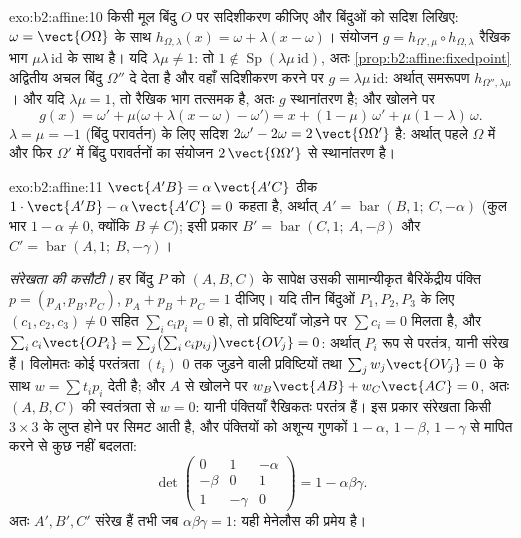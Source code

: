 \begin{solution}{exo:b2:affine:10}
किसी मूल बिंदु $O$ पर सदिशीकरण कीजिए और बिंदुओं को सदिश लिखिए: $\omega = \vect{O\Omega}$ के साथ
$h_{\Omega, \lambda}(x) = \omega + \lambda(x - \omega)$। संयोजन $g = h_{\Omega',
\mu} \circ h_{\Omega, \lambda}$ रैखिक भाग $\mu\lambda\,\mathrm{id}$ के साथ  है। यदि $\lambda\mu \neq 1$: तो $1 \notin
\operatorname{Sp}(\lambda\mu\,\mathrm{id})$, अतः \cref{prop:b2:affine:fixedpoint}
अद्वितीय अचल बिंदु $\Omega''$ दे देता है और वहाँ सदिशीकरण करने पर $g =
\lambda\mu\,\mathrm{id}$: अर्थात्
समरूपण $h_{\Omega'',
\lambda\mu}$। और यदि $\lambda\mu = 1$, तो रैखिक भाग तत्समक है, अतः $g$ स्थानांतरण है;
और खोलने पर
\[
g(x) = \omega' + \mu\bigl(\omega + \lambda(x - \omega) -
\omega'\bigr) = x + (1 - \mu)\,\omega' + \mu(1 -
\lambda)\,\omega .
\]
$\lambda = \mu = -1$ (बिंदु परावर्तन) के लिए सदिश $2\omega' - 2\omega = 2\,\vect{\Omega\Omega'}$ है: अर्थात् पहले $\Omega$ में और फिर
$\Omega'$ में बिंदु परावर्तनों का संयोजन $2\,\vect{\Omega\Omega'}$ से स्थानांतरण है।
\end{solution}

\begin{solution}{exo:b2:affine:11}
$\vect{A'B} = \alpha\,\vect{A'C}$ ठीक $1\cdot
\vect{A'B} - \alpha\,\vect{A'C} = 0$ कहता है, अर्थात् $A' =
\operatorname{bar}(B, 1;\ C, -\alpha)$ (कुल भार $1 -
\alpha \neq 0$, क्योंकि $B \neq C$); इसी प्रकार
$B' =
\operatorname{bar}(C, 1;\ A, -\beta)$ और $C' =
\operatorname{bar}(A, 1;\ B, -\gamma)$।

\emph{संरेखता की कसौटी।} हर बिंदु $P$ को $(A, B, C)$ के सापेक्ष उसकी सामान्यीकृत
बैरिकेंद्रीय पंक्ति $p = (p_A, p_B, p_C)$, $p_A + p_B +
p_C = 1$ दीजिए। यदि तीन बिंदुओं $P_1, P_2,
P_3$ के लिए $(c_1, c_2, c_3) \neq 0$ सहित
$\sum_i c_i p_i = 0$ हो, तो प्रविष्टियाँ जोड़ने पर $\sum c_i = 0$ मिलता है, और $\sum_i c_i \vect{OP_i} = \sum_j \bigl(\sum_i
c_ip_{ij}\bigr)\vect{OV_j} = 0$: अर्थात् $P_i$ 
रूप से परतंत्र, यानी संरेख हैं। विलोमतः कोई  परतंत्रता $(t_i)$ $0$ तक
जुड़ने वाली प्रविष्टियों तथा $\sum_j w_j\vect{OV_j} = 0$ के साथ $w = \sum t_ip_i$ देती है; और $A$ से खोलने पर
$w_B
\vect{AB} + w_C\vect{AC} = 0$, अतः $(A, B, C)$ की  स्वतंत्रता से $w = 0$: यानी पंक्तियाँ रैखिकतः परतंत्र
हैं। इस प्रकार संरेखता किसी $3 \times 3$  के लुप्त होने पर सिमट आती है, और
पंक्तियों को अशून्य गुणकों $1 - \alpha$, $1 -
\beta$, $1 - \gamma$ से मापित करने से कुछ नहीं
बदलता:
\[
\det\begin{pmatrix} 0 & 1 & -\alpha\\ -\beta & 0 & 1\\ 1 &
-\gamma & 0\end{pmatrix}
= 1 - \alpha\beta\gamma .
\]
अतः $A', B', C'$ संरेख हैं तभी जब $\alpha\beta\gamma = 1$: यही मेनेलौस की प्रमेय है।
\end{solution}

